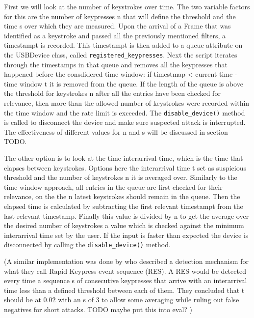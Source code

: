 First we will look at the number of keystrokes over time. The two variable factors for this are the number of keypresses n that will define the threshold and the time s over which they are measured. 
Upon the arrival of a Frame that was identified as a keystroke and passed all the previously mentioned filters, a timestampt is recorded. This timestampt is then added to a queue attribute on the USBDevice class, called \verb|registered_keypresses|. Next the script iterates through the timestamps in that queue and removes all the keypresses that happened before the consdidered time window: if timestmap < current time - time window t it is removed from the queue. If the length of the queue is above the threshold for keystrokes n after all the entries have been checked for relevance, then more than the allowed number of keystrokes were recorded within the time window and the rate limit is exceeded. The \verb|disable_device()| method is called to disconnect the device and make sure suspected attack is interrupted. The effectiveness of different values for n and s will be discussed in section TODO. 


The other option is to look at the time interarrival time, which is the time that elapses between keystrokes. Options here the interarrival time t set as suspicious threshold and the number of keystrokes n it is averaged over. Similarly to the time window approach, all entries in the queue are first checked for their relevance, on the the n latest keystrokes should remain in the queue. Then the elapsed time is calculated by subtracting the first relevant timestampt from the last relevant timestamp. Finally this value is divided by n to get the average over the desired number of keystrokes a value which is checked against the minimum interarrival time set by the user. If the input is faster than expected the device is disconnected by calling the \verb|disable_device()| method. 


(A similar implementation was done by \cite{neunerUSBlockBlockingUSBBased2018} who described a detection mechanism for what they call Rapid Keypress event sequence (RES). A RES would be detected every time a sequence s of consecutive keypresses that arrive with an interarrival time less than a defined threshold between each of them. They concluded that t should be at 0.02 with an s of 3 to allow some averaging while ruling out false negatives for short attacks. TODO maybe put this into eval? )














